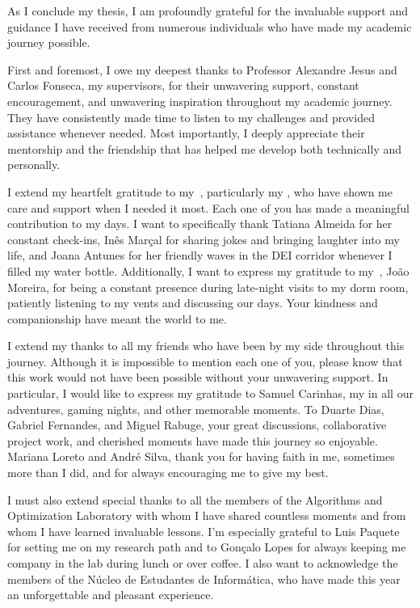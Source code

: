 \begin{acknowledgments}

  As I conclude my thesis, I am profoundly grateful for the invaluable support and
  guidance I have received from numerous individuals who have made my academic
  journey possible.

  First and foremost, I owe my deepest thanks to Professor Alexandre Jesus and
  Carlos Fonseca, my supervisors, for their unwavering support, constant
  encouragement, and unwavering inspiration throughout my academic journey. They
  have consistently made time to listen to my challenges and provided assistance
  whenever needed. Most importantly, I deeply appreciate their mentorship and the
  friendship that has helped me develop both technically and personally.

  I extend my heartfelt gratitude to my~, particularly my
  , who have shown me care and support when I needed it most. Each
  one of you has made a meaningful contribution to my days. I want to specifically
  thank Tatiana Almeida for her constant check-ins, Inês Marçal for sharing jokes
  and bringing laughter into my life, and Joana Antunes for her friendly waves in
  the DEI corridor whenever I filled my water bottle. Additionally, I want to
  express my gratitude to my~, João Moreira, for being a constant presence
  during late-night visits to my dorm room, patiently listening to my vents and
  discussing our days. Your kindness and companionship have meant the world to me.

  I extend my thanks to all my friends who have been by my side throughout this
  journey. Although it is impossible to mention each one of you, please know that
  this work would not have been possible without your unwavering support. In
  particular, I would like to express my gratitude to Samuel Carinhas, my
   in all our adventures, gaming nights, and other memorable moments. To Duarte
  Dias, Gabriel Fernandes, and Miguel Rabuge, your great discussions,
  collaborative project work, and cherished moments have made this journey so
  enjoyable. Mariana Loreto and André Silva, thank you for having faith in me,
  sometimes more than I did, and for always encouraging me to give my best.

  I must also extend special thanks to all the members of the Algorithms and
  Optimization Laboratory with whom I have shared countless moments and from whom
  I have learned invaluable lessons. I'm especially grateful to Luis Paquete for
  setting me on my research path and to Gonçalo Lopes for always keeping me
  company in the lab during lunch or over coffee. I also want to acknowledge the
  members of the Núcleo de Estudantes de Informática, who have made this year an
  unforgettable and pleasant experience.


\end{acknowledgments}
